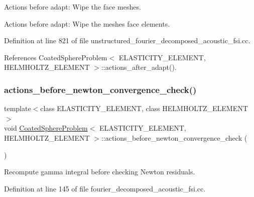 Actions before adapt\+: Wipe the face meshes. 

Actions before adapt\+: Wipe the meshes face elements. 

Definition at line 821 of file unstructured\+\_\+fourier\+\_\+decomposed\+\_\+acoustic\+\_\+fsi.\+cc.



References Coated\+Sphere\+Problem$<$ E\+L\+A\+S\+T\+I\+C\+I\+T\+Y\+\_\+\+E\+L\+E\+M\+E\+N\+T, H\+E\+L\+M\+H\+O\+L\+T\+Z\+\_\+\+E\+L\+E\+M\+E\+N\+T $>$\+::actions\+\_\+after\+\_\+adapt().

\mbox{\label{classCoatedSphereProblem_a2f55bc904971ca96eb9af3451ef5b4c4}} 
\subsubsection{\texorpdfstring{actions\+\_\+before\+\_\+newton\+\_\+convergence\+\_\+check()}{actions\_before\_newton\_convergence\_check()}\hspace{0.1cm}{\footnotesize\ttfamily [1/2]}}
{\footnotesize\ttfamily template$<$class E\+L\+A\+S\+T\+I\+C\+I\+T\+Y\+\_\+\+E\+L\+E\+M\+E\+NT, class H\+E\+L\+M\+H\+O\+L\+T\+Z\+\_\+\+E\+L\+E\+M\+E\+NT$>$ \\
void \hyperlink{classCoatedSphereProblem}{Coated\+Sphere\+Problem}$<$ E\+L\+A\+S\+T\+I\+C\+I\+T\+Y\+\_\+\+E\+L\+E\+M\+E\+NT, H\+E\+L\+M\+H\+O\+L\+T\+Z\+\_\+\+E\+L\+E\+M\+E\+NT $>$\+::actions\+\_\+before\+\_\+newton\+\_\+convergence\+\_\+check (\begin{DoxyParamCaption}{ }\end{DoxyParamCaption})\hspace{0.3cm}{\ttfamily [inline]}}



Recompute gamma integral before checking Newton residuals. 



Definition at line 145 of file fourier\+\_\+decomposed\+\_\+acoustic\+\_\+fsi.\+cc.

\mbox{\label{classCoatedSphereProblem_a2f55bc904971ca96eb9af3451ef5b4c4}} 
